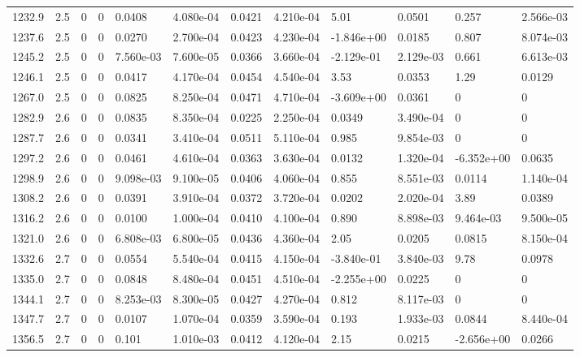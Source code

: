 \documentclass[preview]{standalone}
\begin{document}
{{{{\begin{tabular}{L{1.2cm}C{1.2cm} C{0.3cm}C{0.5cm} C{1.4cm}C{1.4cm} C{1.4cm}C{1.4cm} C{1.6cm}C{1.6cm} C{1.6cm}C{1.6cm}}
  1232.9  &   2.5  & 0     &  0 &  0.0408  & 4.080e-04  &  0.0421&   4.210e-04& 5.01 & 0.0501   &  0.257 & 2.566e-03  \\ 
  1237.6  &   2.5  & 0     &  0 &  0.0270  & 2.700e-04  &  0.0423&   4.230e-04& -1.846e+00 & 0.0185   &  0.807 & 8.074e-03  \\ 
  1245.2  &   2.5  & 0     &  0 &  7.560e-03  & 7.600e-05  &  0.0366&   3.660e-04& -2.129e-01 & 2.129e-03   &  0.661 & 6.613e-03  \\ 
  1246.1  &   2.5  & 0     &  0 &  0.0417  & 4.170e-04  &  0.0454&   4.540e-04& 3.53 & 0.0353   &  1.29 & 0.0129  \\ 
  1267.0  &   2.5  & 0     &  0 &  0.0825  & 8.250e-04  &  0.0471&   4.710e-04& -3.609e+00 & 0.0361   &  0 & 0  \\ 
  1282.9  &   2.6  & 0     &  0 &  0.0835  & 8.350e-04  &  0.0225&   2.250e-04& 0.0349 & 3.490e-04   &  0 & 0  \\ 
  1287.7  &   2.6  & 0     &  0 &  0.0341  & 3.410e-04  &  0.0511&   5.110e-04& 0.985 & 9.854e-03   &  0 & 0  \\ 
  1297.2  &   2.6  & 0     &  0 &  0.0461  & 4.610e-04  &  0.0363&   3.630e-04& 0.0132 & 1.320e-04   &  -6.352e+00 & 0.0635  \\ 
  1298.9  &   2.6  & 0     &  0 &  9.098e-03  & 9.100e-05  &  0.0406&   4.060e-04& 0.855 & 8.551e-03   &  0.0114 & 1.140e-04  \\ 
  1308.2  &   2.6  & 0     &  0 &  0.0391  & 3.910e-04  &  0.0372&   3.720e-04& 0.0202 & 2.020e-04   &  3.89 & 0.0389  \\ 
  1316.2  &   2.6  & 0     &  0 &  0.0100  & 1.000e-04  &  0.0410&   4.100e-04& 0.890 & 8.898e-03   &  9.464e-03 & 9.500e-05  \\ 
  1321.0  &   2.6  & 0     &  0 &  6.808e-03  & 6.800e-05  &  0.0436&   4.360e-04& 2.05 & 0.0205   &  0.0815 & 8.150e-04  \\ 
  1332.6  &   2.7  & 0     &  0 &  0.0554  & 5.540e-04  &  0.0415&   4.150e-04& -3.840e-01 & 3.840e-03   &  9.78 & 0.0978  \\ 
  1335.0  &   2.7  & 0     &  0 &  0.0848  & 8.480e-04  &  0.0451&   4.510e-04& -2.255e+00 & 0.0225   &  0 & 0  \\ 
  1344.1  &   2.7  & 0     &  0 &  8.253e-03  & 8.300e-05  &  0.0427&   4.270e-04& 0.812 & 8.117e-03   &  0 & 0  \\ 
  1347.7  &   2.7  & 0     &  0 &  0.0107  & 1.070e-04  &  0.0359&   3.590e-04& 0.193 & 1.933e-03   &  0.0844 & 8.440e-04  \\ 
  1356.5  &   2.7  & 0     &  0 &  0.101  & 1.010e-03  &  0.0412&   4.120e-04& 2.15 & 0.0215   &  -2.656e+00 & 0.0266  \\ 
\hline 
\end{tabular} 

}}}}
\end{document}
